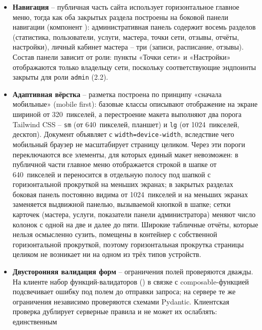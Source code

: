 \begin{itemize}
  \item \textbf{Навигация} -- публичная часть сайта использует
        горизонтальное главное меню, тогда как оба закрытых раздела
        построены на боковой панели навигации (компонент
        ): административная панель
        содержит восемь разделов (статистика, пользователи, услуги,
        мастера, точки сети, отзывы, отчёты, настройки), личный кабинет
        мастера -- три (записи, расписание, отзывы). Состав панели
        зависит от роли: пункты «Точки сети» и «Настройки» отображаются
        только владельцу сети, поскольку соответствующие эндпоинты
        закрыты для роли \texttt{admin} (2.2).
  \item \textbf{Адаптивная вёрстка} -- разметка построена по принципу
        «сначала мобильные» (mobile first): базовые классы описывают
        отображение на экране шириной от 320~пикселей, а перестроение
        макета выполняют два порога Tailwind CSS --
        \texttt{sm} (от 640~пикселей, планшет) и \texttt{lg} (от
        1024~пикселей, десктоп). Документ объявляет
         с \texttt{width=device-width}, вследствие чего
        мобильный браузер не масштабирует страницу целиком. Через эти
        пороги переключаются все элементы, для которых единый макет
        невозможен: в публичной части главное меню отображается строкой
        в шапке от 640~пикселей и переносится в отдельную полосу под
        шапкой с горизонтальной прокруткой на меньших экранах; в
        закрытых разделах боковая панель постоянно видима от
        1024~пикселей и на меньших экранах заменяется выдвижной панелью,
        вызываемой кнопкой в шапке; сетки карточек (мастера, услуги,
        показатели панели администратора) меняют число колонок с одной
        на две и далее до пяти. Широкие табличные отчёты, которые нельзя
        осмысленно сузить, помещены в контейнер с собственной
        горизонтальной прокруткой, поэтому горизонтальная прокрутка
        страницы целиком не возникает ни на одном из трёх типов
        устройств.
  \item \textbf{Двусторонняя валидация форм} -- ограничения полей
        проверяются дважды. На клиенте набор функций-валидаторов
        () в связке с composable-функцией
         подсвечивает ошибку под
        полем до отправки запроса; на сервере те же ограничения
        независимо проверяются схемами Pydantic. Клиентская проверка
        дублирует серверные правила и не может их ослаблять: единственным

\end{itemize}
